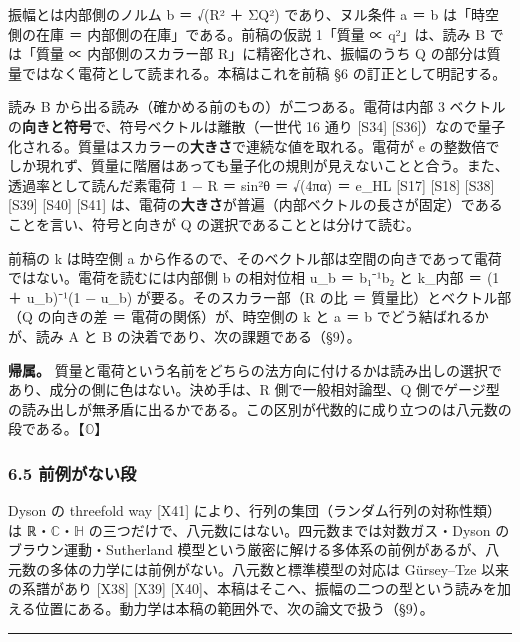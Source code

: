 \documentclass[
  a4paper,
]{ltjsarticle}
\begin{document}
振幅とは内部側のノルム \textbar b\textbar{} ＝ √(R² ＋ ΣQ²)
であり、ヌル条件 \textbar a\textbar{} ＝ \textbar b\textbar{}
は「時空側の在庫 ＝ 内部側の在庫」である。前稿の仮説 1「質量 ∝
\textbar q\textbar²」は、読み B では「質量 ∝ 内部側のスカラー部
R」に精密化され、振幅のうち Q
の部分は質量ではなく電荷として読まれる。本稿はこれを前稿 §6
の訂正として明記する。

読み B から出る読み（確かめる前のもの）が二つある。電荷は内部 3
ベクトルの\textbf{向きと符号}で、符号ベクトルは離散（一世代 16 通り
{[}S34{]}
{[}S36{]}）なので量子化される。質量はスカラーの\textbf{大きさ}で連続な値を取れる。電荷が
e
の整数倍でしか現れず、質量に階層はあっても量子化の規則が見えないことと合う。また、透過率として読んだ素電荷
1 − R ＝ sin²θ ＝ √(4πα) ＝ e\_HL {[}S17{]} {[}S18{]} {[}S38{]}
{[}S39{]} {[}S40{]} {[}S41{]}
は、電荷の\textbf{大きさ}が普遍（内部ベクトルの長さが固定）であることを言い、符号と向きが
Q の選択であることとは分けて読む。

前稿の k は時空側 a
から作るので、そのベクトル部は空間の向きであって電荷ではない。電荷を読むには内部側
b の相対位相 u\_b ＝ b₁⁻¹b₂ と k\_内部 ＝ (1 ＋ u\_b)⁻¹(1 − u\_b)
が要る。そのスカラー部（R の比 ＝ 質量比）とベクトル部（Q の向きの差 ＝
電荷の関係）が、時空側の k と \textbar a\textbar{} ＝
\textbar b\textbar{} でどう結ばれるかが、読み A と B
の決着であり、次の課題である（§9）。

\textbf{帰属。}
質量と電荷という名前をどちらの法方向に付けるかは読み出しの選択であり、成分の側に色はない。決め手は、R
側で一般相対論型、Q
側でゲージ型の読み出しが無矛盾に出るかである。この区別が代数的に成り立つのは八元数の段である。【\(\mathbb{O}\)】

\subsubsection{6.5
前例がない段}\label{ux524dux4f8bux304cux306aux3044ux6bb5}

Dyson の threefold way {[}X41{]}
により、行列の集団（ランダム行列の対称性類）は
ℝ・\(\mathbb{C}\)・\(\mathbb{H}\)
の三つだけで、八元数にはない。四元数までは対数ガス・Dyson
のブラウン運動・Sutherland
模型という厳密に解ける多体系の前例があるが、八元数の多体の力学には前例がない。八元数と標準模型の対応は
Gürsey--Tze 以来の系譜があり {[}X38{]} {[}X39{]}
{[}X40{]}、本稿はそこへ、振幅の二つの型という読みを加える位置にある。動力学は本稿の範囲外で、次の論文で扱う（§9）。

\begin{center}\rule{0.5\linewidth}{0.5pt}\end{center}
\end{document}
